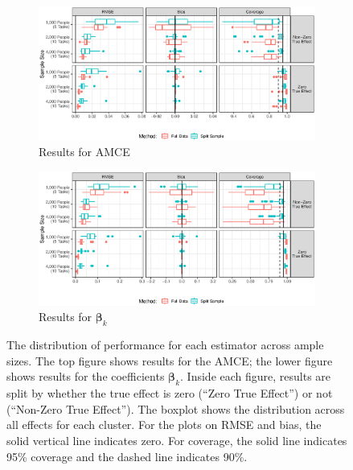 \begin{figure}
	
	\begin{subfigure}{\textwidth}	
		\caption{Results for AMCE}
		\includegraphics[width=\textwidth]{figures/app_perf_splitsample_ame.eps}
	\end{subfigure}

	\begin{subfigure}{\textwidth}	
			\caption{Results for $\bm{\beta}_k$}
			\includegraphics[width=\textwidth]{figures/app_perf_splitsample_beta.eps}
	\end{subfigure}

	\caption{The distribution of performance for each estimator across ample sizes. The top figure shows results for the AMCE; the lower figure shows results for the coefficients $\bm{\beta}_k$. Inside each figure, results are split by whether the true effect is zero (``Zero True Effect'') or not (``Non-Zero True Effect''). The boxplot shows the distribution across all effects for each cluster. For the plots on RMSE and bias, the solid vertical line indicates zero. For coverage, the solid line indicates 95\% coverage and the dashed line indicates 90\%.}\label{fig:app_dist_simulations}
\end{figure}

